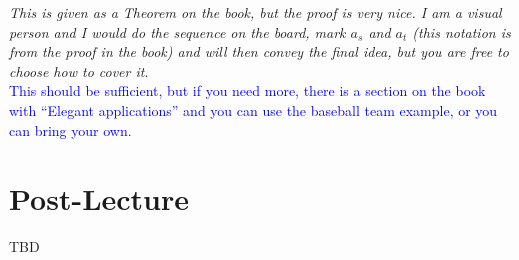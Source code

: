 \documentclass{article}
\begin{document}
{\it This is given as a Theorem on the book, but the proof is very nice. I am a visual person and I would do the sequence on the board, mark $a_s$ and $a_t$ (this notation is from the proof in the book) and will then convey the final idea, but you are free to choose how to cover it}.\\

\textcolor{blue}{This should be sufficient, but if you need more, there is a section on the book with ``Elegant applications'' and you can use the baseball team example, or you can bring your own.}



\section*{Post-Lecture}
TBD
\end{document}
